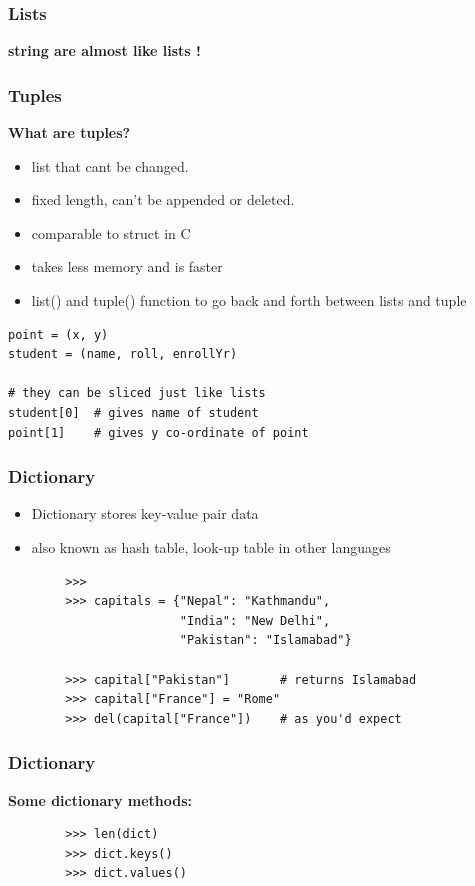 \documentclass[12pt, aspectratio=169]{beamer}
\begin{document}
\begin{frame}[fragile]
  \frametitle{Lists}
\vspace{1em}
\textbf{string are almost like lists !}
\end{frame}

\begin{frame}
  \frametitle{Tuples}
\textbf{What are tuples?}
\begin{itemize}
\item list that cant be changed. 
\item fixed length, can't be appended or deleted.
\item comparable to struct in C
\item takes less memory and is faster 
\item list() and tuple() function to go back and forth between lists and tuple
\end{itemize}
\pause
\begin{verbatim}
point = (x, y)
student = (name, roll, enrollYr)

# they can be sliced just like lists
student[0]  # gives name of student
point[1]    # gives y co-ordinate of point

\end{verbatim}
\end{frame}

\begin{frame} [fragile]
  \frametitle{Dictionary}
  \begin{itemize}
  \item Dictionary stores key-value pair data \pause
  \item  also known as hash table, look-up table in other languages \pause
  \end{itemize}
  \vspace{1em}
\begin{verbatim}
        >>> 
        >>> capitals = {"Nepal": "Kathmandu",
                        "India": "New Delhi",
                        "Pakistan": "Islamabad"}

        >>> capital["Pakistan"]       # returns Islamabad
        >>> capital["France"] = "Rome"
        >>> del(capital["France"])    # as you'd expect
\end{verbatim}
\end{frame}

\begin{frame} [fragile]
  \frametitle{Dictionary}
\textbf{Some dictionary methods: }
 \begin{verbatim}
        >>> len(dict)
        >>> dict.keys()
        >>> dict.values()
 \end{verbatim}
\vfill
\end{frame}
\end{document}
